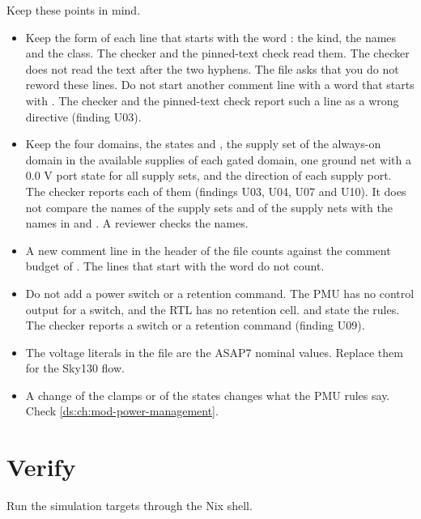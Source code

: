 Keep these points in mind.
\begin{itemize}
  \item Keep the form of each line that starts with the word : the kind, the names and the class. The checker and the pinned-text check read them. The checker does not read the text after the two hyphens. The file asks that you do not reword these lines. Do not start another comment line with a word that starts with . The checker and the pinned-text check report such a line as a wrong directive (finding U03).
  \item Keep the four domains, the states  and , the supply set of the always-on domain in the available supplies of each gated domain, one ground net with a 0.0 V port state for all supply sets, and the direction  of each supply port. The checker reports each of them (findings U03, U04, U07 and U10). It does not compare the names of the supply sets and of the supply nets with the names in  and . A reviewer checks the names.
  \item A new comment line in the header of the file counts against the comment budget of . The lines that start with the word  do not count.
  \item Do not add a power switch or a retention command. The PMU has no control output for a switch, and the RTL has no retention cell.  and  state the rules. The checker reports a switch or a retention command (finding U09).
  \item The voltage literals in the file are the ASAP7 nominal values. Replace them for the Sky130 flow.
  \item A change of the clamps or of the states changes what the PMU rules say. Check \cref{ds:ch:mod-power-management}.
\end{itemize}

\section{Verify}\label{um:ch:power-integration:verify}
Run the simulation targets through the Nix shell.

